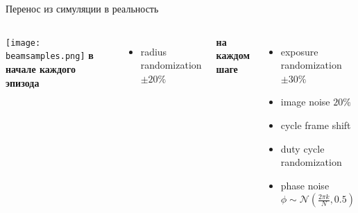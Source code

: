 \begin{frame}{Перенос из симуляции в реальность}
\begin{columns}
\centering
\texttt{[image: beamsamples.png]}
\textbf{в начале каждого эпизода}
\begin{itemize}
    \item radius randomization $\pm 20\%$
\end{itemize}
\textbf{на каждом шаге}
\begin{itemize}
    \item exposure randomization $\pm 30\%$
    \item image noise $20\%$
    \item cycle frame shift
    \item duty cycle randomization
    \item phase noise $\phi \sim \mathcal{N}(\frac{2\pi k}{N}, 0.5)$
\end{itemize}
\end{columns}
\end{frame}

